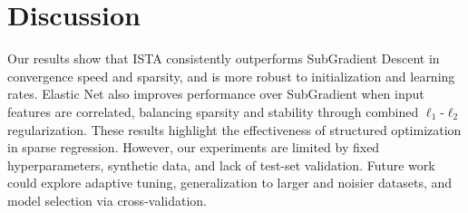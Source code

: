 \documentclass[11pt]{article}
\begin{document}
\section{Discussion}
Our results show that ISTA consistently outperforms SubGradient Descent in convergence speed and sparsity, and is more robust to initialization and learning rates. Elastic Net also improves performance over SubGradient when input features are correlated, balancing sparsity and stability through combined $\ell_1$-$\ell_2$ regularization. These results highlight the effectiveness of structured optimization in sparse regression. However, our experiments are limited by fixed hyperparameters, synthetic data, and lack of test-set validation. Future work could explore adaptive tuning, generalization to larger and noisier datasets, and model selection via cross-validation.
\end{document}
